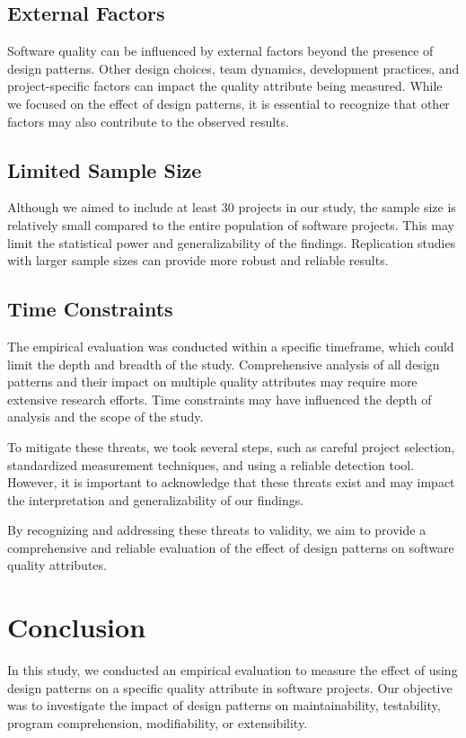 \documentclass[conference]{IEEEtran}
\begin{document}
	\subsection{External Factors}
	Software quality can be influenced by external factors beyond the presence of design patterns. Other design choices, team dynamics, development practices, and project-specific factors can impact the quality attribute being measured. While we focused on the effect of design patterns, it is essential to recognize that other factors may also contribute to the observed results.
	
	\subsection{Limited Sample Size}
	Although we aimed to include at least 30 projects in our study, the sample size is relatively small compared to the entire population of software projects. This may limit the statistical power and generalizability of the findings. Replication studies with larger sample sizes can provide more robust and reliable results.
	
	\subsection{Time Constraints}
	The empirical evaluation was conducted within a specific timeframe, which could limit the depth and breadth of the study. Comprehensive analysis of all design patterns and their impact on multiple quality attributes may require more extensive research efforts. Time constraints may have influenced the depth of analysis and the scope of the study.
	
	To mitigate these threats, we took several steps, such as careful project selection, standardized measurement techniques, and using a reliable detection tool. However, it is important to acknowledge that these threats exist and may impact the interpretation and generalizability of our findings.
	
	By recognizing and addressing these threats to validity, we aim to provide a comprehensive and reliable evaluation of the effect of design patterns on software quality attributes.
	
	\section{Conclusion}
	In this study, we conducted an empirical evaluation to measure the effect of using design patterns on a specific quality attribute in software projects. Our objective was to investigate the impact of design patterns on maintainability, testability, program comprehension, modifiability, or extensibility.
	
\end{document}
